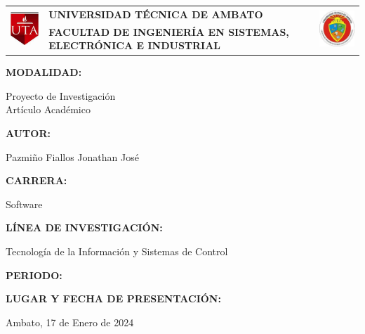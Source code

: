 \begin{titlepage}
	\begin{center}
		\begin{tabular}{l  p{}  l}
			\multirow{2}{*}{
				\includegraphics[width=20mm]{resources/images/logo-uta-rojo.png}
			}                                                             &
			\bfseries\uppercase{\centering Universidad Técnica de Ambato} &
			\multirow{2}{*}{
				\includegraphics[width=25mm]{resources/images/logo-fisei-feo.jpeg}
			}                                                                                                                                                              \\
			                                                              & \bfseries\uppercase{\centering Facultad de Ingeniería en Sistemas, Electrónica e Industrial} & \\
		\end{tabular}
		\vspace{2cm}
	\end{center}
	{\textbf{MODALIDAD: }\par}
	\begin{center}
		Proyecto de Investigación  \\
		Artículo Académico \fbox{\phantom{X}}
	\end{center}
	{\textbf{AUTOR: }\par}
	\begin{center}
		Pazmiño Fiallos Jonathan José
	\end{center}
	{\textbf{CARRERA: }\par}
	\begin{center}
		Software
	\end{center}
	{\textbf{LÍNEA DE INVESTIGACIÓN: }\par}
	\begin{center}
		Tecnología de la Información y Sistemas de Control
	\end{center}
	{\textbf{PERIODO: }\par}
	\begin{center}
		\periodo
	\end{center}
	{\textbf{LUGAR Y FECHA DE PRESENTACIÓN: }\par}
	\begin{center}
		Ambato, 17 de Enero de 2024
	\end{center}
	\vfill
\end{titlepage}
